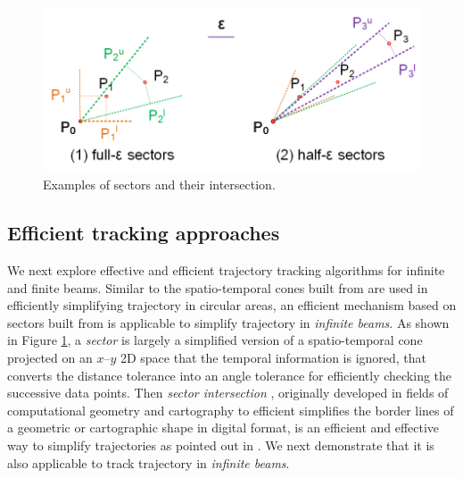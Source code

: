 \begin{figure}[tb!]
	\centering
	\includegraphics[scale=1.0]{figures/Fig-Sleeve.png}
	\vspace{-2ex}
	\caption{\small Examples of sectors and their intersection.}
	\vspace{-2ex}
	\label{fig:sleeve}
\end{figure}

\subsection{Efficient tracking approaches}
\label{sec:track_cone_sector}


We next explore effective and efficient trajectory tracking algorithms for infinite and finite beams.
%
Similar to the spatio-temporal cones built from \sed are used in efficiently simplifying trajectory in circular areas, an efficient mechanism based on sectors built from \ped is applicable to simplify trajectory in \emph{infinite beams}. As shown in Figure \ref{fig:sleeve}, a \emph{sector}  is largely a simplified version of a spatio-temporal cone  projected on an $x$--$y$ 2D space that the temporal information is ignored, that converts the \ped distance tolerance into an angle tolerance for efficiently checking the successive data points. 
Then \textit{sector intersection} \cite{Williams:Longest, Sklansky:Cone, Dunham:Cone, Zhao:Sleeve}, originally developed in fields of computational geometry and cartography to efficient simplifies the border lines of a geometric or cartographic shape in digital format, is an efficient and effective way to simplify trajectories as pointed out in \cite{Lin:Cised}.
We next demonstrate that it is also applicable to track trajectory in \emph{infinite beams}.


